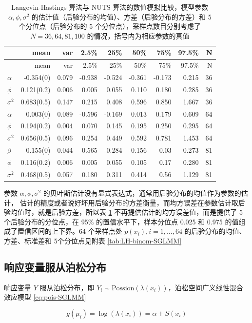 \documentclass[12pt,a4paper,UTF8,twoside]{book}
\theoremstyle{definition}
\theoremstyle{definition}
\theoremstyle{definition}
\theoremstyle{remark}
\begin{document}
\begin{longtable}[]{@{}lrrrrrrrr@{}}
\caption{\label{tab:MCLH-vs-NUTS} Langevin-Hastings 算法与 NUTS
算法的数值模拟比较，模型参数 \(\alpha,\phi,\sigma^2\)
的估计值（后验分布的均值）、方差（后验分布的方差）和 5
个分位点（后验分布的 5 个分位点），采样点数目分别考虑了
\(N = 36, 64, 81, 100\) 的情况，括号内为相应参数的真值}\tabularnewline
\toprule
& mean & var & 2.5\% & 25\% & 50\% & 75\% & 97.5\% & N\tabularnewline
\midrule
\endfirsthead
\toprule
& mean & var & 2.5\% & 25\% & 50\% & 75\% & 97.5\% & N\tabularnewline
\midrule
\endhead
\(\alpha\) & -0.354(0) & 0.079 & -0.938 & -0.524 & -0.361 & -0.173 &
0.215 & 36\tabularnewline
\(\phi\) & 0.121(0.2) & 0.006 & 0.005 & 0.055 & 0.110 & 0.180 & 0.285 &
36\tabularnewline
\(\sigma^2\) & 0.683(0.5) & 0.147 & 0.215 & 0.408 & 0.596 & 0.850 &
1.667 & 36\tabularnewline
\(\alpha\) & 0.003(0) & 0.089 & -0.596 & -0.169 & 0.013 & 0.179 & 0.609
& 64\tabularnewline
\(\phi\) & 0.194(0.2) & 0.004 & 0.070 & 0.145 & 0.195 & 0.250 & 0.295 &
64\tabularnewline
\(\sigma^2\) & 0.656(0.5) & 0.096 & 0.254 & 0.449 & 0.592 & 0.781 &
1.453 & 64\tabularnewline
\(\beta\) & -0.155(0) & 0.044 & -0.565 & -0.284 & -0.156 & -0.03 & 0.273
& 81\tabularnewline
\(\phi\) & 0.116(0.2) & 0.006 & 0.005 & 0.055 & 0.105 & 0.17 & 0.280 &
81\tabularnewline
\(\sigma^2\) & 0.468(0.5) & 0.057 & 0.180 & 0.311 & 0.414 & 0.56 & 1.129
& 81\tabularnewline
\bottomrule
\end{longtable}

参数 \(\alpha,\phi,\sigma^2\)
的贝叶斯估计没有显式表达式，通常用后验分布的均值作为参数的估计，
估计的精度或者说好坏用后验分布的方差衡量，而均方误差在参数估计取后验均值时，就是后验方差，所以表
\ref{tab:MCLH-vs-NUTS} 不再提供估计的均方误差值，而是提供了 5
个后验分布的分位点，在 95\% 的置信水平下，样本分位点 0.025 和 0.975
的值组成了置信区间的上下界。64 个采样点处 \(p(x_i), i = 1, \ldots, 64\)
的后验分布的均值、方差、标准差和 5个分位点见附表
\ref{tab:LH-binom-SGLMM}

\hypertarget{possion-sglmm}{%
\subsection{响应变量服从泊松分布}\label{possion-sglmm}}

响应变量 \(Y\) 服从泊松分布，即
\(Y_i \sim \mathrm{Possion}(\lambda(x_{i}))\)，泊松空间广义线性混合效应模型
\eqref{eq:pois-SGLMM}

\begin{equation}
g(\mu_i) = \log(\lambda(x_i)) = \alpha + S(x_i) \label{eq:pois-SGLMM}
\end{equation}
\end{document}
